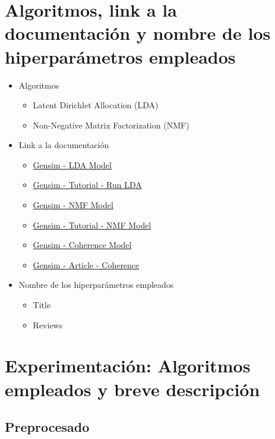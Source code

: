\documentclass{report}
\begin{document}
{        \section{Algoritmos, link a la documentación y nombre de los hiperparámetros empleados}
            \begin{itemize}
                \item Algoritmos
                \begin{itemize}
                    \item Latent Dirichlet Allocation (LDA)
                    \item Non-Negative Matrix Factorization (NMF)
                \end{itemize}
                \item Link a la documentación
                \begin{itemize}
                    \item \href{https://radimrehurek.com/gensim/models/ldamodel.html}{Gensim - LDA Model}
                    \item \href{https://radimrehurek.com/gensim/auto_examples/tutorials/run_lda.html}{Gensim - Tutorial - Run LDA}
                    \item \href{https://radimrehurek.com/gensim/models/nmf.html}{Gensim - NMF Model}
                    \item \href{https://radimrehurek.com/gensim_3.8.3/models/nmf.html}{Gensim - Tutorial - NMF Model}
                    \item \href{https://radimrehurek.com/gensim/models/coherencemodel.html}{Gensim - Coherence Model}
                    \item \href{https://gensimr.news-r.org/articles/coherence}{Gensim - Article - Coherence}
                \end{itemize}
                \item Nombre de los hiperparámetros empleados
                \begin{itemize}
                    \item Title
                    \item Reviews
                \end{itemize}
            \end{itemize}
        \clearpage\section{Experimentación: Algoritmos empleados y breve descripción}
            \subsection{Preprocesado}
}
\end{document}
